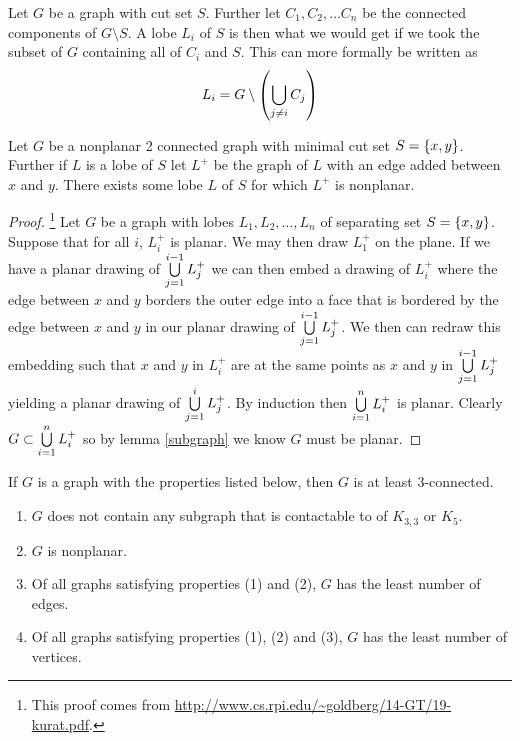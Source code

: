 \documentclass{article}
\begin{document}
\begin{definition}[lobe]
	Let $G$ be a graph with cut set $S$. Further let $C_1, C_2, \ldots C_n$ be the connected components of $G\setminus S$. A lobe $L_i$ of $S$ is then what we would get if we took the subset of $G$ containing all of $C_i$ and $S$. This can more formally be written as
	$$
	L_i = G\setminus \left(\bigcup\limits_{j\not=i}^{}  {C_j} \right)
	$$
\end{definition}

\begin{lemma}\label{lobes}
	Let $G$ be a nonplanar 2 connected graph with minimal cut set $S=\left\{ {x,y} \right\}$. Further if $L$ is a lobe of $S$ let $L^+$ be the graph of $L$ with an edge added between $x$ and $y$. There exists some lobe $L$ of $S$ for which $L^+$ is nonplanar. 
\end{lemma}

\begin{proof} \footnote{This proof comes from \url{http://www.cs.rpi.edu/~goldberg/14-GT/19-kurat.pdf}.}
	Let $G$ be a graph with lobes $L_1, L_2, \ldots, L_n$ of separating set $S=\left\{ {x,y} \right\}$. Suppose that for all $i$, $L_i^+$ is planar. We may then draw $L_1^+$ on the plane. If we have a planar drawing of $\bigcup\limits_{j = 1}^{i-1}  {L_j^+} $ we can then embed a drawing of $L_i^+$ where the edge between $x$ and $y$ borders the outer edge into a face that is bordered by the edge between $x$ and $y$ in our planar drawing of $\bigcup\limits_{j = 1}^{i-1}  {L_j^+} $. We then can redraw this embedding such that $x$ and $y$ in $L_i^+$ are at the same points as $x$ and $y$ in $\bigcup\limits_{j = 1}^{i-1}  {L_j^+} $ yielding a planar drawing of $\bigcup\limits_{j=1}^{i}  {L_j^+} $. By induction then $\bigcup\limits_{i=1}^{n}  {L_i^+} $ is planar. Clearly $G \subset \bigcup\limits_{i=1}^{n}  {L_i^+} $ so by lemma \ref{subgraph} we know $G$ must be planar.
\end{proof}

\begin{lemma}\label{3connect}
	If $G$ is a graph with the properties listed below, then $G$ is at least 3-connected.
	\begin{enumerate}
		\item $G$ does not contain any subgraph that is contactable to of $K_{3,3}$ or $K_5$.
		\item $G$ is nonplanar.
		\item Of all graphs satisfying properties (1) and (2), $G$ has the least number of edges.
		\item Of all graphs satisfying properties (1), (2) and (3), $G$ has the least number of vertices.
	\end{enumerate}
\end{lemma}
\end{document}
